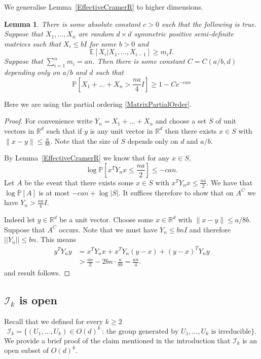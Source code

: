 \documentclass[10pt, english,oneside,reqno]{amsart}
\theoremstyle{plain}
\newtheorem{lemma}[theorem]{Lemma}
\theoremstyle{remark}
\numberwithin{equation}{section}
\numberwithin{figure}{section}
\newcommand{\R}{\mathbb{R}}
\begin{document}
We generalise Lemma~\ref{EffectiveCramerR} to higher dimensions.

\begin{lemma}\label{lemma:cramer}
    There is some absolute constant $c>0$ such that the following is true. Suppose that $X_1, \dots, X_n$ are random $d \times d$ symmetric positive semi-definite matrices such that $X_i \leq b I$ for some $b > 0$ and
    $$\mathbb{E}[X_i | X_1, \dots, X_{i-1}] \geq m_i I.$$
    Suppose that $\sum_{i=1}^{n}m_i = an$. Then there is some constant $C = C(a/b, d)$ depending only on $a/b$ and $d$ such that $$\mathbb{P}\left[X_1 + \dots + X_n > \frac{na}{4}I\right] \geq 1 - Ce^{-can}$$
\end{lemma}

Here we are using the partial ordering \eqref{MatrixPartialOrder}.

\begin{proof}
    For convenience write $Y_n = X_1 + \ldots + X_n$ and choose a set $S$ of unit vectors in $\R^d$ such that if $y$ is any unit vector in $\R^d$ then there exists $x \in S$ with $\| x-y \| \leq \frac{a}{8b}$. Note that the size of $S$ depends only on $d$ and $a/b$.

    By Lemma~\ref{EffectiveCramerR} we know that for any $x \in S$, $$\log \mathbb{P}\left[x^{T}Y_n x \leq \frac{na}{2}\right] \leq - can.$$ Let $A$ be the event that there exists some $x \in S$ with $x^{T}Y_n x \leq \frac{na}{2}$. We have that $\log \mathbb{P}[A]$ is at most $-can + \log |S|$. It suffices therefore to show that on $A^C$ we have $Y_n > \frac{na}{4}I$.

    Indeed let $y \in \R^d$ be a unit vector. Choose some $x \in \R^d$ with $\| x-y\| \leq a /8 b$. Suppose that $A^C$ occurs. Note that we must have $Y_n \leq bnI$ and therefore $||Y_n|| \leq bn$. This means
    \begin{align*}
        y^TY_n y & = x^TY_n x + x^TY_n (y-x) + (y-x)^TY_n y\\
        & > \frac{an}{2} - 2bn \cdot \frac{a}{8b}  = \frac{an}{4}.
    \end{align*}
    and result follows.
\end{proof}

\subsection{$\mathcal{I}_k$ is open}

Recall that we defined for every $k \geq 2$  $$\mathcal{I}_{k} = \{ (U_1, \ldots , U_{k}) \in O(d)^{k} \,:\, \text{the group generated by } U_1,\ldots, U_{k} \text{ is irreducible}  \}.$$ We provide a brief proof of the claim mentioned in the introduction that $\mathcal{I}_k$ is an open subset of $O(d)^{k}$.
\end{document}
